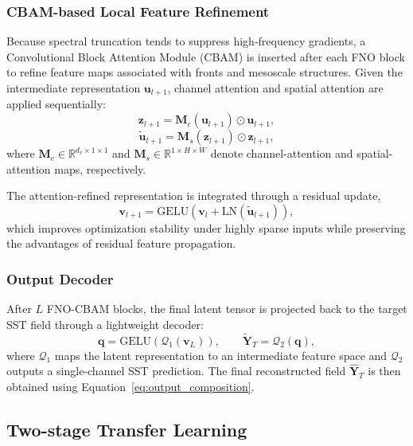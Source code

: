 \documentclass[12pt,reqno]{amsart}
\begin{document}
\subsubsection{CBAM-based Local Feature Refinement}

Because spectral truncation tends to suppress high-frequency gradients, a Convolutional Block Attention Module (CBAM) is inserted after each FNO block to refine feature maps associated with fronts and mesoscale structures. Given the intermediate representation $\mathbf{u}_{l+1}$, channel attention and spatial attention are applied sequentially:
\begin{equation}
\mathbf{z}_{l+1} = \mathbf{M}_c(\mathbf{u}_{l+1})\odot\mathbf{u}_{l+1},
\end{equation}
\begin{equation}
\tilde{\mathbf{u}}_{l+1} = \mathbf{M}_s(\mathbf{z}_{l+1})\odot\mathbf{z}_{l+1},
\end{equation}
where $\mathbf{M}_c\in\mathbb{R}^{d_v\times1\times1}$ and $\mathbf{M}_s\in\mathbb{R}^{1\times H\times W}$ denote channel-attention and spatial-attention maps, respectively.

The attention-refined representation is integrated through a residual update,
\begin{equation}
\mathbf{v}_{l+1} = \mathrm{GELU}\!\left(\mathbf{v}_l + \mathrm{LN}(\tilde{\mathbf{u}}_{l+1})\right),
\end{equation}
which improves optimization stability under highly sparse inputs while preserving the advantages of residual feature propagation.

\subsubsection{Output Decoder}

After $L$ FNO-CBAM blocks, the final latent tensor is projected back to the target SST field through a lightweight decoder:
\begin{equation}
\mathbf{q} = \mathrm{GELU}\!\left(\mathcal{Q}_1(\mathbf{v}_L)\right),
\qquad
\tilde{\mathbf{Y}}_T = \mathcal{Q}_2(\mathbf{q}),
\end{equation}
where $\mathcal{Q}_1$ maps the latent representation to an intermediate feature space and $\mathcal{Q}_2$ outputs a single-channel SST prediction. The final reconstructed field $\hat{\mathbf{Y}}_T$ is then obtained using Equation~\eqref{eq:output_composition}.

\subsection{Two-stage Transfer Learning}
\label{sec:transfer}
\end{document}
